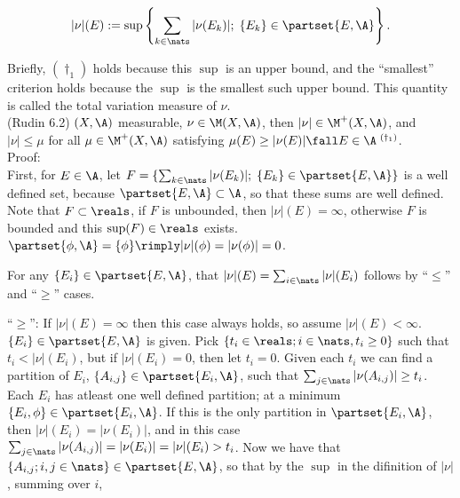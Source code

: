 $$
|\nu|(E) := \sup \left\{  \sum_{k \in \nats} |\nu(E_k)| ; \; \{ E_k\} \in \partset{E, \A}  \right\}.
$$

\noindent   
Briefly, ${(\dagger_1)}$ holds because this $\sup$ is an upper bound, and the ``smallest'' criterion holds because the $\sup$ is the smallest such upper bound. This quantity is called the total variation measure of $\nu$. \\






(Rudin 6.2) $(X, \A)$ measurable, $\nu \in \M(X,\A)$, then $|\nu| \in \M^+(X, \A)$, and $|\nu| \le \mu$ for all $\mu  \in \M^+(X, \A)$ satisfying  $\mu(E)  \ge |\nu(E)| \fall E \in \A \; {}^{(\dagger_1)} $. \\


Proof: \\

\noindent
First, for $E \in \A$, let $ F = \{  \sum_{k \in \nats} |\nu(E_k)| ; \; \{ E_k\} \in \partset{E, \A}  \}$ is a well defined set, because $\partset{E, \A} \subset \A$, so that these sums are well defined. Note that $F \subset \reals$, if $F$ is unbounded, then $|\nu|(E) = \infty$, otherwise $F$ is bounded and this $\sup(F) \in \reals$ exists. \\


\noindent
 $\partset{\phi, \A} = \{ \phi \} \rimply |\nu|(\phi) = |\nu(\phi)| = 0$. 

\noindent 
For any $\{ E_i \} \in \partset{E, \A}$, that $|\nu|(E) = \sum_{i \in \nats} |\nu|(E_i)$ follows by ``$\le$'' and ``$\ge$'' cases. \\


\noindent


\noindent
``$\ge$'': If $|\nu|(E) = \infty$ then this case always holds, so assume $|\nu|(E) < \infty$. $\{ E_i \} \in \partset{ E, \A }$ is given. Pick $\{ t_i \in \reals; i \in \nats, t_i \ge 0 \}$ such that $t_i < |\nu|(E_i)$, but if $|\nu|(E_i) = 0$, then let $t_i = 0$. Given each $t_i$ we can find a partition of $E_i$, $\{A_{i,j} \} \in \partset{E_i, \A}$, such that $\sum_{j \in \nats} |\nu(A_{i,j})| \ge t_i$. Each $E_i$ has atleast one well defined partition; at a minimum $\{E_i, \phi \} \in \partset{E_i, \A}$. If this is the only partition in $\partset{E_i, \A}$, then $|\nu|(E_i) = |\nu(E_i)|$, and in this case $\sum_{j \in \nats} |\nu(A_{i,j})| = |\nu(E_i)| = |\nu|(E_i) > t_i$.  Now we have that $\{ A_{i,j}; i,j \in \nats \} \in \partset{E, \A}$, so that by the $\sup$ in the difinition of $|\nu|$, summing over $i$,

